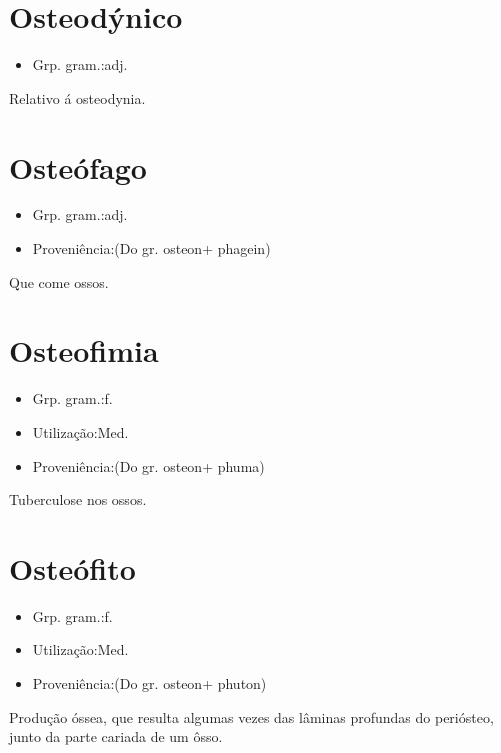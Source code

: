 \section{Osteodýnico}
\begin{itemize}
\item {Grp. gram.:adj.}
\end{itemize}
Relativo á osteodynia.
\section{Osteófago}
\begin{itemize}
\item {Grp. gram.:adj.}
\end{itemize}
\begin{itemize}
\item {Proveniência:(Do gr. \textunderscore osteon\textunderscore  + \textunderscore phagein\textunderscore )}
\end{itemize}
Que come ossos.
\section{Osteofimia}
\begin{itemize}
\item {Grp. gram.:f.}
\end{itemize}
\begin{itemize}
\item {Utilização:Med.}
\end{itemize}
\begin{itemize}
\item {Proveniência:(Do gr. \textunderscore osteon\textunderscore  + \textunderscore phuma\textunderscore )}
\end{itemize}
Tuberculose nos ossos.
\section{Osteófito}
\begin{itemize}
\item {Grp. gram.:f.}
\end{itemize}
\begin{itemize}
\item {Utilização:Med.}
\end{itemize}
\begin{itemize}
\item {Proveniência:(Do gr. \textunderscore osteon\textunderscore  + \textunderscore phuton\textunderscore )}
\end{itemize}
Produção óssea, que resulta algumas vezes das lâminas profundas do periósteo, junto da parte cariada de um ôsso.
